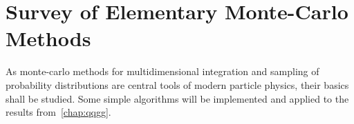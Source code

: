 
\chapter{Survey of Elementary Monte-Carlo Methods}%
\label{chap:mc}

As monte-carlo methods for multidimensional integration and sampling
of probability distributions are central tools of modern particle
physics, their basics shall be studied.  Some simple algorithms will
be implemented and applied to the results from~\ref{chap:qqgg}.
